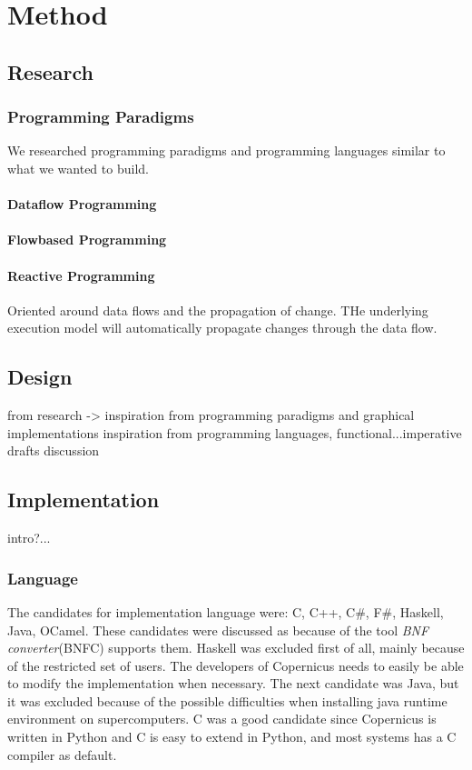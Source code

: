 \chapter{Method}

\section{Research}

\subsection{Programming Paradigms}
We researched programming paradigms and programming languages similar
to what we wanted to build.

\subsubsection{Dataflow Programming}

\subsubsection{Flowbased Programming}

\subsubsection{Reactive Programming}
Oriented around data flows and the propagation of change. THe
underlying execution model will automatically propagate changes
through the data flow.


\section{Design}
from research -> inspiration from programming paradigms and graphical implementations
inspiration from programming languages, functional...imperative
drafts
discussion


\section{Implementation}
intro?...

\subsection{Language}
The candidates for implementation language were: C, C++, C\#, F\#,
Haskell, Java, OCamel. These candidates were discussed as because of
the tool \emph{BNF converter}(BNFC) supports them. Haskell was
excluded first of all, mainly because of the restricted set of
users. The developers of Copernicus needs to easily be able to modify
the implementation when necessary. The next candidate was Java, but it
was excluded because of the possible difficulties when installing java
runtime environment on supercomputers. C was a good candidate since
Copernicus is written in Python and C is easy to extend in Python, and
most systems has a C compiler as default.

